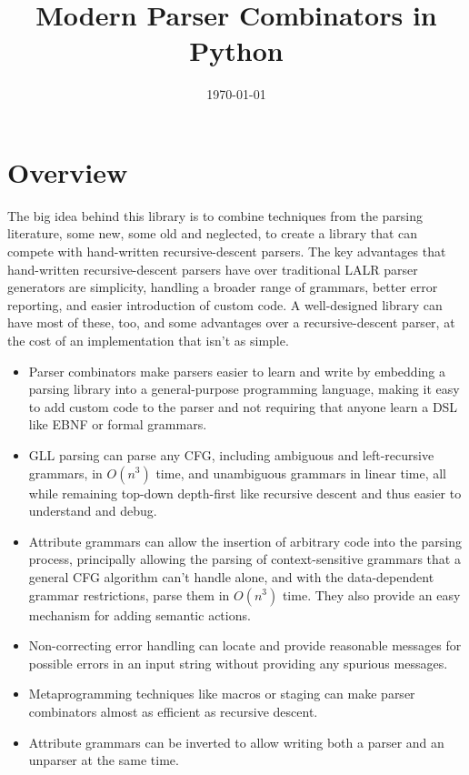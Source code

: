 \documentclass[12pt]{article}
\title{Modern Parser Combinators in Python}
\date{\today}
\begin{document}
\maketitle

\section{Overview}
\label{sec:overview}

The big idea behind this library is to combine techniques from the
parsing literature, some new, some old and neglected, to create a
library that can compete with hand-written recursive-descent parsers.
The key advantages that hand-written recursive-descent parsers have
over traditional LALR parser generators are simplicity, handling a
broader range of grammars, better error reporting, and easier
introduction of custom code.  A well-designed library can have most of
these, too, and some advantages over a recursive-descent parser, at
the cost of an implementation that isn't as simple.

\begin{itemize}
\item Parser combinators make parsers easier to learn and write by
  embedding a parsing library into a general-purpose programming
  language, making it easy to add custom code to the parser and not
  requiring that anyone learn a DSL like EBNF or formal grammars.
\item GLL parsing can parse any CFG, including ambiguous and
  left-recursive grammars, in $O(n^3)$ time, and unambiguous grammars
  in linear time, all while remaining top-down depth-first like
  recursive descent and thus easier to understand and debug.
\item Attribute grammars can allow the insertion of arbitrary code
  into the parsing process, principally allowing the parsing of
  context-sensitive grammars that a general CFG algorithm can't handle
  alone, and with the data-dependent grammar restrictions, parse them
  in $O(n^3)$ time.  They also provide an easy mechanism for adding
  semantic actions.
\item Non-correcting error handling can locate and provide reasonable
  messages for possible errors in an input string without
  providing any spurious messages.
\item Metaprogramming techniques like macros or staging can make
  parser combinators almost as efficient as recursive descent.
\item Attribute grammars can be inverted to allow writing both a
  parser and an unparser at the same time.
\end{itemize}
\end{document}
